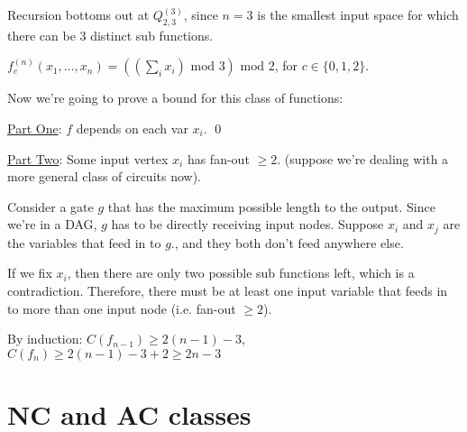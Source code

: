 \documentclass[11pt]{article} %
\begin{document}

Recursion bottoms out at $Q_{2,3}^{(3)}$, since $n = 3$ is the smallest input space for which there can be $3$ distinct sub functions.

 $f_c^{(n)} (x_1, \ldots, x_n) = \left( \left( \sum_i x_i \right) \text{ mod } 3\right) \text { mod } 2$, for $c \in \{0,1,2\}$.

Now we're going to prove a bound for this class of functions:



\underline{Part One}: $f$ depends on each var $x_i$. \qed

\underline{Part Two}: Some input vertex $x_i$ has fan-out $\geq 2$. (suppose we're dealing with a more general class of circuits now). 

Consider a gate $g$ that has the maximum possible length to the output. Since we're in a DAG, $g$ has to be directly receiving input nodes. Suppose $x_i$ and $x_j$ are the variables that feed in to $g$., and they both don't feed anywhere else.

If we fix $x_i$, then there are only two possible sub functions left, which is a contradiction. Therefore, there must be at least one input variable that feeds in to more than one input node (i.e. fan-out $\geq 2$).

By induction: $C(f_{n-1}) \geq 2(n-1) -3$, $C(f_n) \geq 2(n-1) - 3 + 2 \geq 2n - 3$


\section{NC and AC classes}

\end{document}

